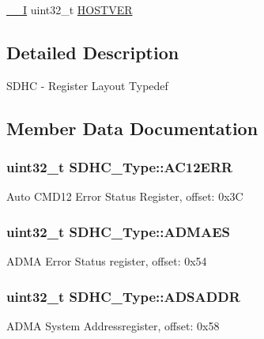 \begin{DoxyCompactItemize}
\item 
\hyperlink{core__sc300_8h_af63697ed9952cc71e1225efe205f6cd3}{\+\_\+\+\_\+I} uint32\+\_\+t \hyperlink{structSDHC__Type_a45a54237012b5f5aab3e48c11a527a0b}{H\+O\+S\+T\+V\+ER}
\end{DoxyCompactItemize}


\subsection{Detailed Description}
S\+D\+HC -\/ Register Layout Typedef 

\subsection{Member Data Documentation}
\subsubsection[{\texorpdfstring{A\+C12\+E\+RR}{AC12ERR}}]{ uint32\+\_\+t S\+D\+H\+C\+\_\+\+Type\+::\+A\+C12\+E\+RR}\hypertarget{structSDHC__Type_a92e6997403c7018aaa8aa23eb0f4b0e7}{}\label{structSDHC__Type_a92e6997403c7018aaa8aa23eb0f4b0e7}
Auto C\+M\+D12 Error Status Register, offset\+: 0x3C 
\subsubsection[{\texorpdfstring{A\+D\+M\+A\+ES}{ADMAES}}]{ uint32\+\_\+t S\+D\+H\+C\+\_\+\+Type\+::\+A\+D\+M\+A\+ES}\hypertarget{structSDHC__Type_a65b39164de39bf3ff0f617dcfa17e346}{}\label{structSDHC__Type_a65b39164de39bf3ff0f617dcfa17e346}
A\+D\+MA Error Status register, offset\+: 0x54 
\subsubsection[{\texorpdfstring{A\+D\+S\+A\+D\+DR}{ADSADDR}}]{ uint32\+\_\+t S\+D\+H\+C\+\_\+\+Type\+::\+A\+D\+S\+A\+D\+DR}\hypertarget{structSDHC__Type_a4bf2d837c70979425d638e1b23b383b5}{}\label{structSDHC__Type_a4bf2d837c70979425d638e1b23b383b5}
A\+D\+MA System Addressregister, offset\+: 0x58 

